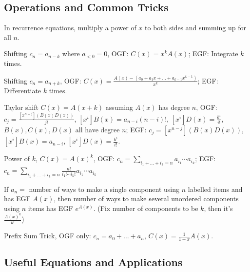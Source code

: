 	\subsection{Operations and Common Tricks}

	In recurrence equations, multiply a power of $x$ to both sides and summing up for all $n$. 


	Shifting $c_n = a_{n-k}$ where $a_{<0}=0$, OGF: $C(x)=x^kA(x)$; EGF: Integrate $k$ times.

	Shifting $c_n = a_{n+k}$, OGF: $C(x)=\frac{A(x)-(a_0+a_1x+\ldots+a_{k-1}x^{k-1})}{x^k}$; EGF: Differentiate $k$ times.

	Taylor shift $C(x)=A(x+k)$ assuming $A(x)$ has degree $n$, OGF: $c_j=\frac{[x^{n-j}](B(x)D(x))}{j!}$, $[x^i]B(x)=a_{n-i}(n-i)!$, $[x^i]D(x)=\frac{k^i}{i!}$, $B(x), C(x), D(x)$ all have degree $n$; EGF: $c_j=[x^{n-j}](B(x)D(x))$, $[x^i]B(x)=a_{n-i}$, $[x^i]D(x)=\frac{k^i}{i!}$.

	Power of $k$, $C(x) = A(x)^k$, OGF: $c_n=\sum_{i_1+\ldots+i_k=n}a_{i_1}\cdots a_{i_k}$; 
	EGF: $c_n=\sum_{i_1+\ldots+i_k=n}\frac{n!}{i_1!\cdots i_k!}a_{i_1}\cdots a_{i_k}$

	If $a_n=$ number of ways to make a single component using $n$ labelled items and has EGF $A(x)$, then number of ways to make several unordered components using $n$ items has EGF $e^{A(x)}$. (Fix number of components to be $k$, then it's $\frac{A(x)^k}{k!}$)

	Prefix Sum Trick, OGF only: $c_n = a_0+\ldots+a_n$, $C(x)=\frac{1}{1-x}A(x)$.





	\subsection{Useful Equations and Applications}

